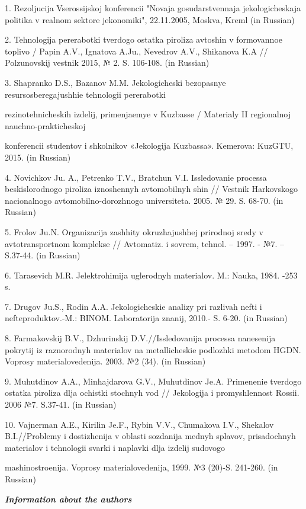 \begin{noparindent}
1. Rezoljucija Vserossijskoj konferencii "Novaja gosudarstvennaja
jekologicheskaja politika v real\textquotesingle nom sektore
jekonomiki", 22.11.2005, Moskva, Kreml\textquotesingle{} (in Russian)

2. Tehnologija pererabotki tverdogo ostatka piroliza avtoshin v
formovannoe toplivo / Papin A.V., Ignatova A.Ju., Nevedrov A.V.,
Shikanova K.A // Polzunovskij vestnik 2015, № 2. S. 106-108. (in
Russian)

3. Shapranko D.S., Bazanov M.M. Jekologicheski bezopasnye
resursosberegajushhie tehnologii pererabotki

rezinotehnicheskih izdelij,
primenjaemye v Kuzbasse / Materialy II regional\textquotesingle noj
nauchno-prakticheskoj

konferencii studentov i
shkol\textquotesingle nikov «Jekologija Kuzbassa». Kemerova: KuzGTU,
2015. (in Russian)

4. Novichkov Ju. A., Petrenko T.V., Bratchun V.I. Issledovanie processa
beskislorodnogo piroliza iznoshennyh avtomobil\textquotesingle nyh shin
// Vestnik Har\textquotesingle kovskogo nacional\textquotesingle nogo
avtomobil\textquotesingle no-dorozhnogo universiteta. 2005. № 29. S.
68-70. (in Russian)

5. Frolov Ju.N. Organizacija zashhity okruzhajushhej prirodnoj sredy v
avtotransportnom komplekse // Avtomatiz. i sovrem, tehnol. -- 1997. -
№7. -- S.37-44. (in Russian)

6. Tarasevich M.R. Jelektrohimija uglerodnyh materialov. M.: Nauka,
1984. -253 s.

7. Drugov Ju.S., Rodin A.A. Jekologicheskie analizy pri razlivah nefti i
nefteproduktov.-M.: BINOM. Laboratorija znanij, 2010.- S. 6-20. (in
Russian)

8. Farmakovskij B.V., Dzhurinskij D.V.//Issledovanija processa
nanesenija pokrytij iz raznorodnyh materialov na metallicheskie
podlozhki metodom HGDN. Voprosy materialovedenija. 2003. №2 (34). (in
Russian)

9. Muhutdinov A.A., Minhajdarova G.V., Muhutdinov Je.A. Primenenie
tverdogo ostatka piroliza dlja ochistki stochnyh vod // Jekologija i
promyshlennost\textquotesingle{} Rossii. 2006 №7. S.37-41. (in Russian)

10. Vajnerman A.E., Kirilin Je.F., Rybin V.V., Chumakova I.V., Shekalov
B.I.//Problemy i dostizhenija v oblasti sozdanija mednyh splavov,
prisadochnyh materialov i tehnologii svarki i naplavki dlja izdelij
sudovogo

mashinostroenija. Voprosy materialovedenija, 1999. №3 (20)-S.
241-260. (in Russian)
\end{noparindent}
\newpage
\emph{{\bfseries Information about the authors}}

